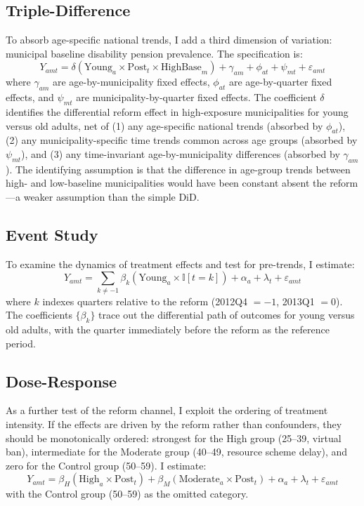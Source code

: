 \documentclass[12pt]{article}
\newcommand{\ind}{\mathbb{I}}
\begin{document}
\subsection{Triple-Difference}

To absorb age-specific national trends, I add a third dimension of variation: municipal baseline disability pension prevalence. The specification is:
\begin{equation}
Y_{amt} = \delta(\text{Young}_a \times \text{Post}_t \times \text{HighBase}_m) + \gamma_{am} + \phi_{at} + \psi_{mt} + \varepsilon_{amt}
\label{eq:ddd}
\end{equation}
where $\gamma_{am}$ are age-by-municipality fixed effects, $\phi_{at}$ are age-by-quarter fixed effects, and $\psi_{mt}$ are municipality-by-quarter fixed effects. The coefficient $\delta$ identifies the differential reform effect in high-exposure municipalities for young versus old adults, net of (1) any age-specific national trends (absorbed by $\phi_{at}$), (2) any municipality-specific time trends common across age groups (absorbed by $\psi_{mt}$), and (3) any time-invariant age-by-municipality differences (absorbed by $\gamma_{am}$). The identifying assumption is that the difference in age-group trends between high- and low-baseline municipalities would have been constant absent the reform---a weaker assumption than the simple DiD.

\subsection{Event Study}

To examine the dynamics of treatment effects and test for pre-trends, I estimate:
\begin{equation}
Y_{amt} = \sum_{k \neq -1} \beta_k (\text{Young}_a \times \ind[t = k]) + \alpha_a + \lambda_t + \varepsilon_{amt}
\label{eq:event}
\end{equation}
where $k$ indexes quarters relative to the reform (2012Q4 $= -1$, 2013Q1 $= 0$). The coefficients $\{\beta_k\}$ trace out the differential path of outcomes for young versus old adults, with the quarter immediately before the reform as the reference period.

\subsection{Dose-Response}

As a further test of the reform channel, I exploit the ordering of treatment intensity. If the effects are driven by the reform rather than confounders, they should be monotonically ordered: strongest for the High group (25--39, virtual ban), intermediate for the Moderate group (40--49, resource scheme delay), and zero for the Control group (50--59). I estimate:
\begin{equation}
Y_{amt} = \beta_H(\text{High}_a \times \text{Post}_t) + \beta_M(\text{Moderate}_a \times \text{Post}_t) + \alpha_a + \lambda_t + \varepsilon_{amt}
\label{eq:dose}
\end{equation}
with the Control group (50--59) as the omitted category.
\end{document}

